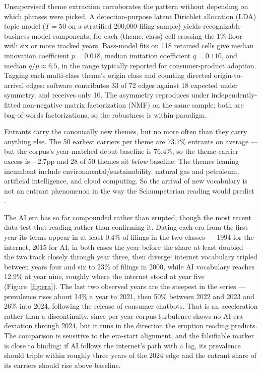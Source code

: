 \documentclass[11pt]{article}
\begin{document}
Unsupervised theme extraction corroborates the pattern without depending
on which phrases were picked. A detection-purpose latent Dirichlet allocation
(LDA) topic model ($T = 50$ on a
stratified 200{,}000-filing sample) yields recognizable business-model
components; for each (theme, class) cell crossing the 1\% floor with six
or more tracked years, Bass-model fits \citep{Bass1969} on 118 retained
cells give median innovation coefficient $p = 0.018$, median imitation
coefficient $q = 0.110$, and median $q/p \approx 6.5$, in the range
typically reported for consumer-product adoption. Tagging each
multi-class theme's origin class and counting directed origin-to-arrival
edges: software contributes 33 of 72 edges against 18 expected under
symmetry, and receives only 10. The asymmetry reproduces under
independently-fitted non-negative matrix factorization (NMF) on the same
sample; both are bag-of-words
factorizations, so the robustness is within-paradigm.

Entrants carry the canonically new themes, but no more often than they
carry anything else. The 50
earliest carriers per theme are 73.7\% entrants on average --- but the
corpus's year-matched debut baseline is 76.4\%, so the theme-carrier
excess is $-2.7$pp and 28 of 50 themes sit \emph{below} baseline.
The themes leaning incumbent include environmental/sustainability, natural
gas and petroleum, artificial intelligence, and cloud computing. So the arrival of new vocabulary is not an entrant
phenomenon in the way the Schumpeterian reading would predict
\citep{Schumpeter1942}.

The AI era has so far compounded rather than erupted, though the most recent
data test that reading rather than confirming it. Dating each era from
the first year its terms appear in at least 0.4\% of filings in the two
classes --- 1994 for the internet, 2015 for AI, in both cases the year
before the share at least doubled --- the two track closely through year three, then
diverge: internet vocabulary tripled between years four and six to 23\% of
filings in 2000, while AI vocabulary reaches 12.9\% at year nine, roughly
where the internet stood at year five (Figure~\ref{fig:era}). The last two
observed years are the steepest in the series --- prevalence rises about
14\% a year to 2021, then 50\% between 2022 and 2023 and 26\% into 2024,
following the release of consumer chatbots. That is an acceleration rather
than a discontinuity, since per-year corpus turbulence shows no AI-era
deviation through 2024, but it runs in the direction the eruption reading
predicts. The comparison is sensitive to the era-start alignment, and the
falsifiable marker is close to binding: if AI follows the internet's path
with a lag, its prevalence should triple within roughly three years of the
2024 edge and the entrant share of its carriers should rise above baseline.
\end{document}
